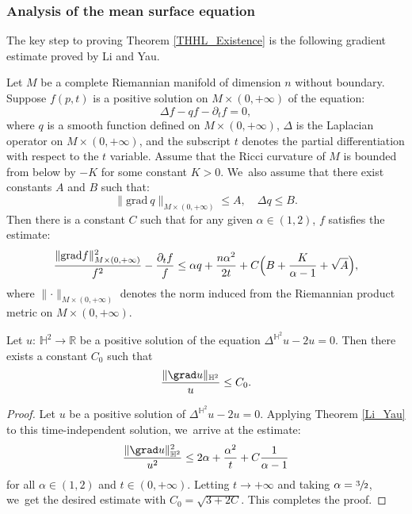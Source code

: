 \subsubsection{Analysis of the mean surface equation}
The key step to proving Theorem \ref{THHL_Existence} is the following gradient estimate proved by Li and Yau.

\begin{theorem}\label{Li_Yau}
Let $M$ be a complete Riemannian manifold of dimension $n$ without boundary. Suppose $f(p, t)$ is a positive solution on $M \times (0, +\infty)$ of the equation:
\[
\Delta f-qf-\partial_tf=0,
\]
where $q$ is a smooth function defined on $M \times (0, +\infty)$, $\Delta$ is the Laplacian operator on $M \times (0, +\infty)$, and the subscript $t$ denotes the partial differentiation with respect to the $t$ variable. Assume that the Ricci curvature of $M$ is bounded from below by $-K$ for some constant $K > 0$. We~also assume that there exist constants $A$ and $B$ such that:
\[
\lVert \mathrm{grad}\ q\rVert_{M\times(0,+\infty)}\leq A,\quad \Delta q\leq B.
\]
Then there is a constant $C$ such that for any given $\alpha \in (1, 2)$, $f$ satisfies the estimate:
\[
\frac{\lVert \mathrm{grad} f\rVert_{M\times(0,+\infty)}^2}{f^2}-\frac{\partial_tf}{f}\leq \alpha q+\frac{n\alpha^2}{2t}+C\Bigl(B+\frac{K}{\alpha-1}+\sqrt{A}\Bigr),
\]
where $\lVert\cdot\rVert_{M \times (0, +\infty)}$ denotes the norm induced from the Riemannian product metric on $M \times (0, +\infty)$.
\end{theorem}
\begin{cor}\label{Li_Yau_Cor}
Let $u{:}\, \mathbb{H}^2 \!\to\! \mathbb{R}$ be a positive solution of the equation \hbox{$\Delta^{\mathbb{H}^2} u \!-\! 2u \!=\! 0$}. Then there exists a constant $C_0$ such that
\[
\frac{\lVert \grad u\rVert_{\mathbb{H}^2}}{u} \leq C_0.
\]
\end{cor}

\begin{proof}
Let $u$ be a positive solution of $\Delta^{\mathbb{H}^2} u - 2u = 0$. Applying Theorem \ref{Li_Yau} to this time-independent solution, we~arrive at the estimate:
\[
\frac{\lVert \grad u\rVert_{\mathbb{H}^2}^2}{u^2} \leq 2\alpha + \frac{\alpha^2}{t} + C\frac{1}{\alpha-1}
\]
for all $\alpha \in (1,2)$ and $t \in (0, +\infty)$. Letting $t \to +\infty$ and taking $\alpha = \sfrac{3}{2}$, we~get the desired estimate with $C_0 = \sqrt{3 + 2C}$. This completes the proof.
\end{proof}


